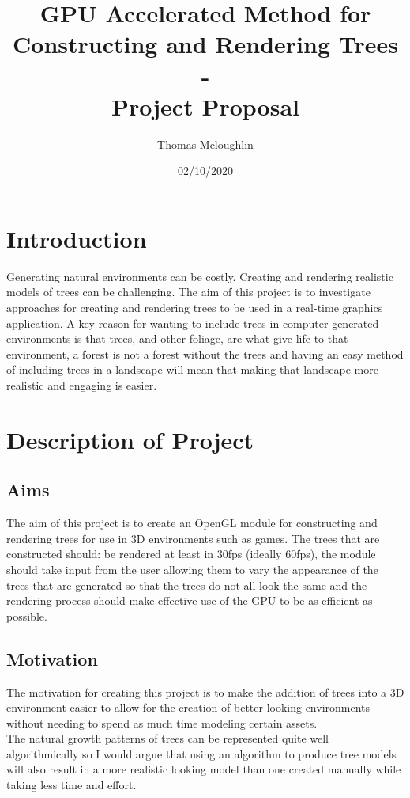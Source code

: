 \documentclass[proposal]{cmpreport}
\title{GPU Accelerated Method for Constructing and Rendering Trees 
        \\ - \\ 
        Project Proposal}
\author{Thomas Mcloughlin}
\date{02/10/2020}
\begin{document}
\maketitle

\pagebreak
\section{Introduction}
Generating natural environments can be costly. Creating and rendering realistic 
models of trees can be challenging. The aim of this project is to investigate 
approaches for creating and rendering trees to be used in a real-time graphics 
application. A key reason for wanting to include trees in computer generated 
environments is that trees, and other foliage, are what give life to that 
environment, a forest is not a forest without the trees and having an easy method 
of including trees in a landscape will mean that making that landscape more 
realistic and engaging is easier.

\section{Description of Project}

\subsection{Aims}
The aim of this project is to create an OpenGL module for constructing and rendering 
trees for use in 3D environments such as games. The trees that are constructed should:
be rendered at least in 30fps (ideally 60fps), the module should take input from the 
user allowing them to vary the appearance of the trees that are generated so that the 
trees do not all look the same and the rendering process should make effective use of 
the GPU to be as efficient as possible.

\subsection{Motivation}
The motivation for creating this project is to make the addition of trees into a 3D 
environment easier to allow for the creation of better looking environments without 
needing to spend as much time modeling certain assets. \\
The natural growth patterns of trees can be represented quite well algorithmically so 
I would argue that using an algorithm to produce tree models will also result in a 
more realistic looking model than one created manually while taking less time and 
effort.
\end{document}

